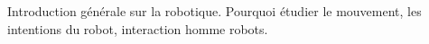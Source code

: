 Introduction générale sur la robotique. Pourquoi étudier le mouvement,
les intentions du robot, interaction homme robots.

